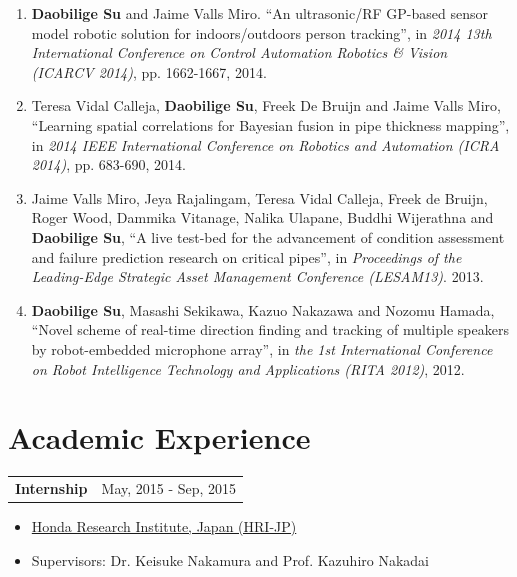\documentclass[margin,line]{res}
\begin{document}
\begin{resume}
\begin{enumerate}
\item {\bf Daobilige Su} and Jaime Valls Miro. ``An ultrasonic/RF GP-based sensor model robotic solution for indoors/outdoors person tracking'', in {\it 2014 13th International Conference on Control Automation Robotics \& Vision (ICARCV 2014)}, pp. 1662-1667, 2014.

\item Teresa Vidal Calleja, {\bf Daobilige Su}, Freek De Bruijn and Jaime Valls Miro, ``Learning spatial correlations for Bayesian fusion in pipe thickness mapping'', in {\it 2014 IEEE International Conference on Robotics and Automation (ICRA 2014)}, pp. 683-690, 2014.

\item Jaime Valls Miro, Jeya Rajalingam, Teresa Vidal Calleja, Freek de Bruijn, Roger Wood, Dammika Vitanage, Nalika Ulapane, Buddhi Wijerathna and {\bf Daobilige Su}, ``A live test-bed for the advancement of condition assessment and failure prediction research on critical pipes'', in {\it Proceedings of the Leading-Edge Strategic Asset Management Conference (LESAM13)}. 2013.

\item {\bf Daobilige Su}, Masashi Sekikawa, Kazuo Nakazawa and Nozomu Hamada, ``Novel scheme of real-time direction finding and tracking of multiple speakers by robot-embedded microphone array'', in {\it the 1st International Conference on Robot Intelligence Technology and Applications (RITA 2012)}, 2012.

\end{enumerate}




\section{\sc Academic Experience}

\begin{tabularx}{\textwidth}{X r}
{\bf Internship} & May, 2015 - Sep, 2015\\
\end{tabularx}
\begin{itemize}
\item[] \href{http://www.jp.honda-ri.com/english}{Honda Research Institute, Japan (HRI-JP)}

\vspace*{-2.5mm}
\item[] Supervisors: Dr. Keisuke Nakamura and Prof. Kazuhiro Nakadai
\end{itemize}


\end{resume}
\end{document}
